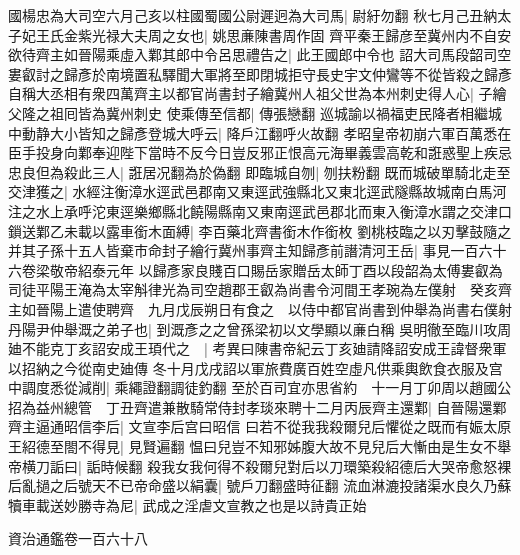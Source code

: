國楊忠為大司空六月己亥以柱國蜀國公尉遲迥為大司馬|{
	尉紆勿翻}
秋七月己丑納太子妃王氏金紫光禄大夫周之女也|{
	姚思亷陳書周作固}
齊平秦王歸彦至冀州内不自安欲待齊主如晉陽乘虛入鄴其郎中令呂思禮告之|{
	此王國郎中令也}
詔大司馬段韶司空婁叡討之歸彥於南境置私驛聞大軍將至即閉城拒守長史宇文仲鸞等不從皆殺之歸彥自稱大丞相有衆四萬齊主以都官尚書封子繪冀州人祖父世為本州刺史得人心|{
	子繪父隆之祖囘皆為冀州刺史}
使乘傳至信都|{
	傳張戀翻}
巡城諭以禍福吏民降者相繼城中動静大小皆知之歸彥登城大呼云|{
	降戶江翻呼火故翻}
孝昭皇帝初崩六軍百萬悉在臣手投身向鄴奉迎陛下當時不反今日豈反邪正恨高元海畢義雲高乾和誑惑聖上疾忌忠良但為殺此三人|{
	誑居况翻為於偽翻}
即臨城自刎|{
	刎扶粉翻}
既而城破單騎北走至交津獲之|{
	水經注衡漳水逕武邑郡南又東逕武強縣北又東北逕武隧縣故城南白馬河注之水上承呼沱東逕樂鄉縣北饒陽縣南又東南逕武邑郡北而東入衡漳水謂之交津口}
鎻送鄴乙未載以露車銜木面縛|{
	李百藥北齊書銜木作銜枚}
劉桃枝臨之以刃擊鼓隨之并其子孫十五人皆棄市命封子繪行冀州事齊主知歸彥前譖清河王岳|{
	事見一百六十六卷梁敬帝紹泰元年}
以歸彥家良賤百口賜岳家贈岳太師丁酉以段韶為太傅婁叡為司徒平陽王淹為太宰斛律光為司空趙郡王叡為尚書令河間王孝琬為左僕射　癸亥齊主如晉陽上遣使聘齊　九月戊辰朔日有食之　以侍中都官尚書到仲舉為尚書右僕射丹陽尹仲舉溉之弟子也|{
	到溉彥之之曾孫梁初以文學顯以亷白稱}
吳明徹至臨川攻周廸不能克丁亥詔安成王頊代之　|{
	考異曰陳書帝紀云丁亥廸請降詔安成王諱督衆軍以招納之今從南史廸傳}
冬十月戊戌詔以軍旅費廣百姓空虛凡供乘輿飲食衣服及宫中調度悉從減削|{
	乘繩證翻調徒釣翻}
至於百司宜亦思省約　十一月丁卯周以趙國公招為益州總管　丁丑齊遣兼散騎常侍封孝琰來聘十二月丙辰齊主還鄴|{
	自晉陽還鄴}
齊主逼通昭信李后|{
	文宣李后宫曰昭信}
曰若不從我我殺爾兒后懼從之既而有娠太原王紹德至閤不得見|{
	見賢遍翻}
愠曰兒豈不知邪姊腹大故不見兒后大慚由是生女不舉帝横刀詬曰|{
	詬時候翻}
殺我女我何得不殺爾兒對后以刀環築殺紹德后大哭帝愈怒裸后亂撾之后號天不已帝命盛以絹囊|{
	號戶刀翻盛時征翻}
流血淋漉投諸渠水良久乃蘇犢車載送妙勝寺為尼|{
	武成之淫虐文宣教之也是以詩貴正始}


資治通鑑卷一百六十八
